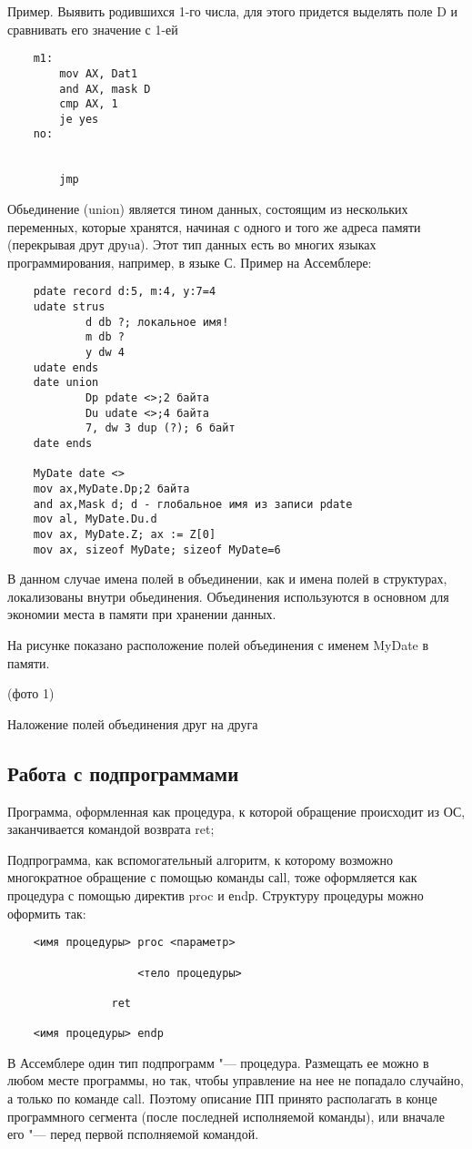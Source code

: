 Пример. Выявить родившихся 1-го числа, для этого придется выделять поле D и сравнивать его значение с 1-ей
\begin{verbatim}
    m1:
        mov AX, Dat1
        and AX, mask D 
        cmp AX, 1
        je yes
    no:
        

        jmp 
\end{verbatim}

Обьединение (union) является тином данных, состоящим из нескольких переменных, которые хранятся, начиная с одного и того же адреса памяти (перекрывая друт друuа). Этот тип данных есть во многих языках программирования, например, в языке С. Пример на Ассемблере: 
\begin{verbatim}
    pdate record d:5, m:4, y:7=4
    udate strus
            d db ?; локальное имя!
            m db ?
            y dw 4
    udate ends 
    date union
            Dp pdate <>;2 байта
            Du udate <>;4 байта
            7, dw 3 dup (?); 6 байт
    date ends

    MyDate date <>
    mov ax,MyDate.Dp;2 байта
    and ax,Mask d; d - глобальное имя из записи pdate
    mov al, MyDate.Du.d
    mov ax, MyDate.Z; ax := Z[0] 
    mov ax, sizeof MyDate; sizeof MyDate=6
\end{verbatim}
В данном случае имена полей в объединении, как и имена полей в структурах, локализованы внутри обьединения. Объединения используются в основном для экономии места в памяти при хранении данных.

На рисунке показано расположение полей объединения с именем MyDate в памяти.

(фото 1)

Наложение полей объединения друг на друга

\subsection{Работа с подпрограммами}
Программа, оформленная как процедура, к которой обращение происходит из ОС, заканчивается командой возврата ret;

Подпрограмма, как вспомогательный алгоритм, к которому возможно многократное обращение с помощью команды саll, тоже оформляется как процедура с помощью директив proc и еndр. Структуру процедуры можно оформить так:
\begin{verbatim}
    <имя процедуры> рroc <параметр>

                    <тело процедуры>

                ret

    <имя процедуры> endp
\end{verbatim}
В Ассемблере один тип подпрограмм "--- процедура. Размещать ее можно в любом месте программы, но так, чтобы управление на нее не попадало случайно, а только по команде саll. Поэтому описание ПП принято располагать в конце программного сегмента (после последней исполняемой команды), или вначале его "--- перед первой псполняемой командой.


